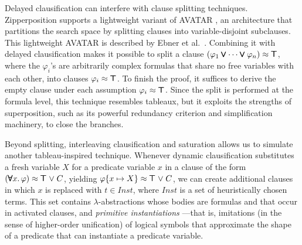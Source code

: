 \documentclass[smallcondensed,draft]{svjour3}     %
\begin{document}
Delayed clausification can interfere with clause splitting techniques.
Zipperposition supports a lightweight variant of AVATAR \cite{av-2014-avatar},
an architecture that partitions the search space by
splitting clauses into variable-disjoint subclauses. This lightweight AVATAR is described
by Ebner et al.\ \cite[Sect.~7]{2021-ebt-unifying-splitting}. Combining it
with delayed clausification makes it possible to split a %
clause $(\varphi_1 \pmb\lor \cdots \pmb\lor \varphi_n) \approx \pmb\top$, where
the $\varphi_i$'s are arbitrarily complex formulas that share no free
variables with each other, into clauses $\varphi_i \approx \pmb\top$.
%
To finish the proof, it suffices to derive the empty clause under each assumption
$\varphi_i \approx \pmb\top$. Since the split is performed at the formula level, this
technique resembles tableaux, but it exploits the strengths of superposition,
such as its powerful redundancy criterion and simplification machinery, to
close the branches.

\newcommand{\instset}{\ensuremath{\mathit{Inst}}}

Beyond splitting, interleaving clausification and saturation allows us to simulate another tableau-inspired
technique. Whenever dynamic clausification substitutes a fresh variable $X$ for
a predicate variable $x$ in a clause of the form $(\pmb\forall x.\, \varphi) \approx
\pmb\top \mathrel\lor C$, yielding $\varphi\{x \mapsto\nobreak X\}
\approx \pmb\top \mathrel\lor C$, we can create additional clauses in which $x$ is replaced
with $t \in \instset$, where $\instset$ is a set of heuristically chosen terms.
This set contains $\lambda$-abstractions whose bodies are formulas and that
occur in activated clauses, and \emph{primitive instantiations}
\cite{our-bool-paper}---that is, imitations (in the sense of higher-order
unification) of logical symbols that approximate the shape of a predicate that
can instantiate a predicate variable.
\end{document}
